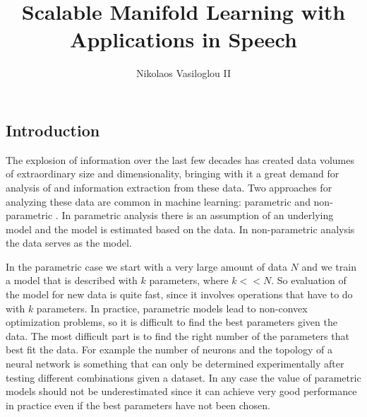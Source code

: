 \documentclass[12pt,letterpaper,doublespaced,ETD,dvips,proposal]{gtthesis}
\title{Scalable Manifold Learning with Applications in Speech}
\author{Nikolaos Vasiloglou II}
\begin{document}
\pagestyle{plain}

\begin{FrontMatter}
\contents %
\end{FrontMatter}

\begin{Body}
\section{Introduction}
\label{intro}The explosion of information over the last few decades has created data volumes of extraordinary size and dimensionality, 
bringing with it a great demand for analysis of and information extraction from these data.
Two approaches for analyzing these data are common in machine learning: parametric \cite{bishop2006pra, hastie2001esl, haykin1994nnc}
and non-parametric \cite{wasserman2006ans}. 
In parametric analysis there is an assumption of an underlying model and the model is estimated based on the data.  
In non-parametric analysis the data serves as the model.



In the parametric case we start with a very large amount of data $N$
and we train a model that is described with $k$ parameters, where
$k<<N$. So evaluation of the model for new data is quite fast, since
it involves operations that have to do with $k$ parameters. In
practice, parametric models lead to non-convex optimization problems,
so it is difficult to find the best parameters given the data. The
most difficult part is to find the right number of the parameters
that best fit the data. For example the number of neurons and the
topology of a neural network is something that can only be
determined experimentally after testing different combinations given
a dataset. In any case the value of parametric models should not be
underestimated since it can achieve very good performance in
practice even if the best parameters have not been chosen.


\end{Body}
\end{document}
